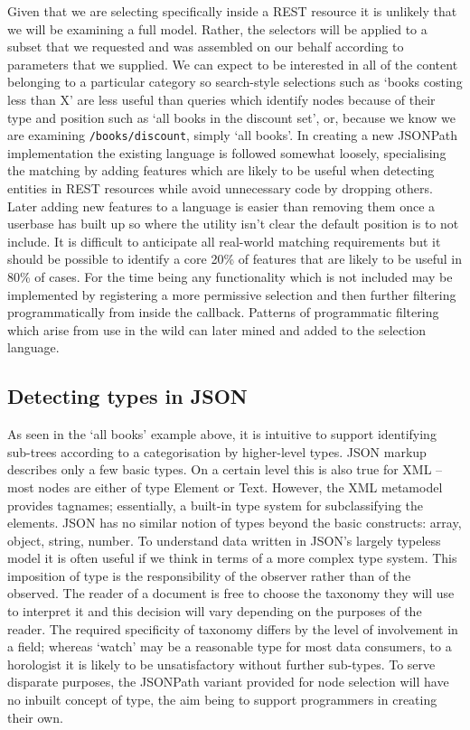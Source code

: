 \documentclass[12pt, ]{article}
\begin{document}
Given that we are selecting specifically inside a REST resource it is
unlikely that we will be examining a full model. Rather, the selectors
will be applied to a subset that we requested and was assembled on our
behalf according to parameters that we supplied. We can expect to be
interested in all of the content belonging to a particular category so
search-style selections such as `books costing less than X' are less
useful than queries which identify nodes because of their type and
position such as `all books in the discount set', or, because we know we
are examining \texttt{/books/discount}, simply `all books'. In creating
a new JSONPath implementation the existing language is followed somewhat
loosely, specialising the matching by adding features which are likely
to be useful when detecting entities in REST resources while avoid
unnecessary code by dropping others. Later adding new features to a
language is easier than removing them once a userbase has built up so
where the utility isn't clear the default position is to not include. It
is difficult to anticipate all real-world matching requirements but it
should be possible to identify a core 20\% of features that are likely
to be useful in 80\% of cases. For the time being any functionality
which is not included may be implemented by registering a more
permissive selection and then further filtering programmatically from
inside the callback. Patterns of programmatic filtering which arise from
use in the wild can later mined and added to the selection language.

\subsection{Detecting types in JSON}\label{detecting-types-in-json}

As seen in the `all books' example above, it is intuitive to support
identifying sub-trees according to a categorisation by higher-level
types. JSON markup describes only a few basic types. On a certain level
this is also true for XML -- most nodes are either of type Element or
Text. However, the XML metamodel provides tagnames; essentially, a
built-in type system for subclassifying the elements. JSON has no
similar notion of types beyond the basic constructs: array, object,
string, number. To understand data written in JSON's largely typeless
model it is often useful if we think in terms of a more complex type
system. This imposition of type is the responsibility of the observer
rather than of the observed. The reader of a document is free to choose
the taxonomy they will use to interpret it and this decision will vary
depending on the purposes of the reader. The required specificity of
taxonomy differs by the level of involvement in a field; whereas `watch'
may be a reasonable type for most data consumers, to a horologist it is
likely to be unsatisfactory without further sub-types. To serve
disparate purposes, the JSONPath variant provided for node selection
will have no inbuilt concept of type, the aim being to support
programmers in creating their own.
\end{document}
